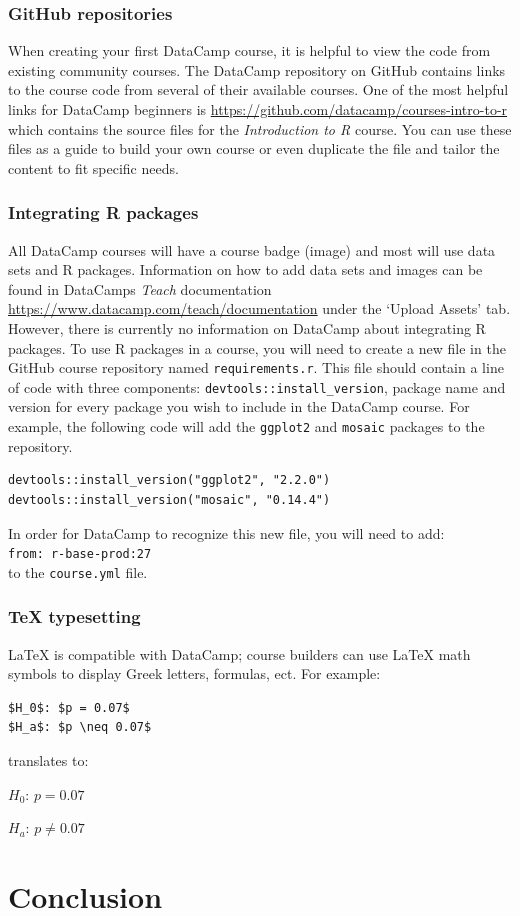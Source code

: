 \documentclass[12pt]{article}\usepackage[]{graphicx}\usepackage[]{color}
\begin{document}
\subsubsection{GitHub repositories}
When creating your first DataCamp course, it is helpful to view the code from existing community courses. 
The DataCamp repository on GitHub contains links to the course code from several of their available courses. One of the most helpful links for DataCamp beginners
is \url{https://github.com/datacamp/courses-intro-to-r} which contains the source files for the \textit{Introduction to R} course.
You can use these files as a guide to build your own course or even duplicate the file and tailor the content to fit specific needs.

\subsubsection{Integrating R packages}
All DataCamp courses will have a course badge (image) and most will use data sets and R packages. Information on how to add data sets and images
can be found in DataCamps \textit{Teach} documentation \url{https://www.datacamp.com/teach/documentation} under the `Upload Assets' tab. However,
there is currently no information on DataCamp about integrating R packages. To use R packages in a course, you will need to create a new file
in the GitHub course repository named \texttt{requirements.r}. This file should contain a line of code with three components: \texttt{devtools::install\_version}, package name and version for 
every package you wish to include in the DataCamp course. For example, the following code will add the \texttt{ggplot2} and \texttt{mosaic} packages to the repository.

\begin{verbatim}
devtools::install_version("ggplot2", "2.2.0")
devtools::install_version("mosaic", "0.14.4")
\end{verbatim}
In order for DataCamp to recognize this new file, you will need to add: \\ \texttt{from: r-base-prod:27} \\ to the \texttt{course.yml} file.

\subsubsection{TeX typesetting}
LaTeX is compatible with DataCamp; course builders can use LaTeX math symbols to display Greek letters, formulas, ect. For example:
\begin{verbatim}
$H_0$: $p = 0.07$
$H_a$: $p \neq 0.07$
\end{verbatim}

translates to:

$H_0$: $p = 0.07$

$H_a$: $p \neq 0.07$

\section{Conclusion}



\end{document}

